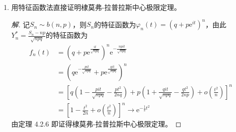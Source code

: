 \documentclass[12pt]{article}
\newcommand{\hei}{\CJKfamily{hei}}                          %
\begin{document}
\begin{enumerate}
\begin{proof}[解]
\begin{equation}
\begin{aligned}
			& \le P\left\{ \frac{1}{{{B}_{n}}}\left| \sum\limits_{k=1}^{n}{{{X}_{k}}} \right|<\sqrt{3}\varepsilon  \right\}	.	
		\end{aligned}
	\end{equation}
	因此，
	\begin{equation}
		\begin{aligned}
			\underset{n\to \infty }{\mathop{\lim }}\,P\left\{ \frac{1}{n}\left| \sum\limits_{k=1}^{n}{{{X}_{k}}} \right|<\varepsilon  \right\}
			& \le \underset{n\to \infty }{\mathop{\lim }}\,P\left\{ \frac{1}{{{B}_{n}}}\left| \sum\limits_{k=1}^{n}{{{X}_{k}}} \right|<\sqrt{3}\varepsilon  \right\} \\ 
			& =\frac{1}{2\pi }\int_{-\sqrt{3}\varepsilon }^{\sqrt{3}\varepsilon }{{{\text{e}}^{-\frac{1}{2}{t}^{2}}}}\text{d}t \\ 
			& <1 .
		\end{aligned}
	\end{equation}
	故不服从大数定律。
\end{proof}


\item {\hei 用特征函数法直接证明棣莫弗-拉普拉斯中心极限定理。}
\begin{proof}[解]
	记$ {{S}_{n}}\sim b\left( n,p \right) $，则$ {{S}_{n}} $的特征函数为$ {{\varphi }_{n}}\left( t \right)={{\left( q+p{{\text{e}}^{it}} \right)}^{n}} $，由此$ Y_{n}^{*}=\displaystyle{\frac{{{S}_{n}}-np}{\sqrt{npq}}} $的特征函数为
	\begin{equation}
		\begin{aligned}
			{{f}_{n}}\left( t \right)&={{\left( q+p{{\text{e}}^{\frac{it}{\sqrt{npq}}}} \right)}^{n}}{{\text{e}}^{-\frac{npit}{\sqrt{npq}}}} \\ 
			& ={{\left( q{{\text{e}}^{-\frac{pit}{\sqrt{npq}}}}+p{{\text{e}}^{\frac{qit}{\sqrt{npq}}}} \right)}^{n}} \\ 
			& ={{\left[ q\left( 1-\frac{pit}{\sqrt{npq}}-\frac{p{{t}^{2}}}{2nq} \right)+p\left( 1+\frac{qit}{\sqrt{npq}}-\frac{q{{t}^{2}}}{2np} \right)+o\left( \frac{{{t}^{2}}}{n} \right) \right]}^{n}} \\ 
			& ={{\left[ 1-\frac{{{t}^{2}}}{2n}+o\left( \frac{{{t}^{2}}}{n} \right) \right]}^{n}}\longrightarrow {{\text{e}}^{-\frac{1}{2}{{t}^{2}}}}
		\end{aligned}
	\end{equation}
	由定理 4.2.6 即证得棣莫弗-拉普拉斯中心极限定理。
\end{proof}


%	



\end{enumerate}
\end{document}
